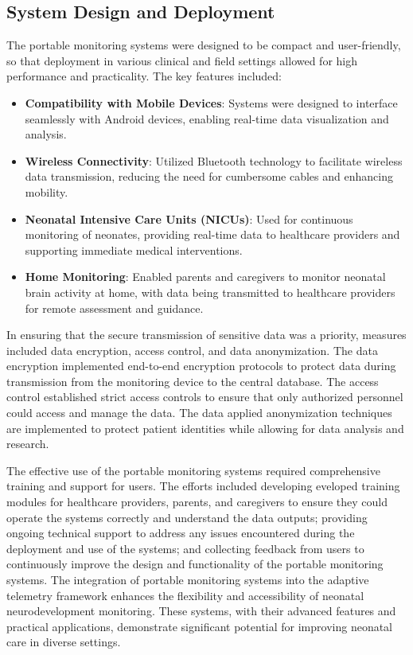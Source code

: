 \documentclass[12pt,journal,compsoc]{IEEEtran}
\begin{document}
\subsection{System Design and Deployment}
The portable monitoring systems were designed to be compact and user-friendly, so that deployment in various clinical and field settings allowed for  high performance and practicality. The key features included:
\begin{itemize}
    \item \textbf{Compatibility with Mobile Devices}: Systems were designed to interface seamlessly with Android devices, enabling real-time data visualization and analysis.
    \item \textbf{Wireless Connectivity}: Utilized Bluetooth technology to facilitate wireless data transmission, reducing the need for cumbersome cables and enhancing mobility.
    \item \textbf{Neonatal Intensive Care Units (NICUs)}: Used for continuous monitoring of neonates, providing real-time data to healthcare providers and supporting immediate medical interventions.
    \item \textbf{Home Monitoring}: Enabled parents and caregivers to monitor neonatal brain activity at home, with data being transmitted to healthcare providers for remote assessment and guidance.
\end{itemize}

In ensuring that the secure transmission of sensitive data was a priority, measures included data encryption, access control, and data anonymization. The data encryption implemented end-to-end encryption protocols to protect data during transmission from the monitoring device to the central database. The access control established strict access controls to ensure that only authorized personnel could access and manage the data. The data applied anonymization techniques are implemented to protect patient identities while allowing for data analysis and research.

The effective use of the portable monitoring systems required comprehensive training and support for users. The efforts included developing eveloped training modules for healthcare providers, parents, and caregivers to ensure they could operate the systems correctly and understand the data outputs; providing ongoing technical support to address any issues encountered during the deployment and use of the systems; and collecting feedback from users to continuously improve the design and functionality of the portable monitoring systems. The integration of portable monitoring systems into the adaptive telemetry framework enhances the flexibility and accessibility of neonatal neurodevelopment monitoring. These systems, with their advanced features and practical applications, demonstrate significant potential for improving neonatal care in diverse settings.
\end{document}
